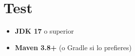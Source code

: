 \documentclass{article}
\begin{document}
\section{Test}

\begin{itemize}
    \item \textbf{JDK 17} o superior
    \item \textbf{Maven 3.8+} (o Gradle si lo prefieres)
\end{itemize}
\end{document}
